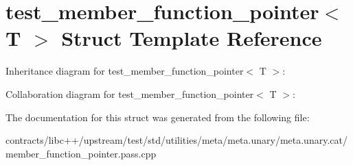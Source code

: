 \hypertarget{structtest__member__function__pointer}{}\section{test\+\_\+member\+\_\+function\+\_\+pointer$<$ T $>$ Struct Template Reference}
\label{structtest__member__function__pointer}


Inheritance diagram for test\+\_\+member\+\_\+function\+\_\+pointer$<$ T $>$\+:


Collaboration diagram for test\+\_\+member\+\_\+function\+\_\+pointer$<$ T $>$\+:


The documentation for this struct was generated from the following file\+:\begin{DoxyCompactItemize}
\item 
contracts/libc++/upstream/test/std/utilities/meta/meta.\+unary/meta.\+unary.\+cat/member\+\_\+function\+\_\+pointer.\+pass.\+cpp\end{DoxyCompactItemize}
